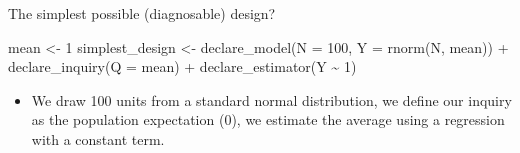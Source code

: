 \documentclass[
  11pt,
  ignorenonframetext,
]{beamer}
\newenvironment{Shaded}{\begin{snugshade}}{\end{snugshade}}
\newcommand{\AttributeTok}[1]{\textcolor[rgb]{0.40,0.45,0.13}{#1}}
\newcommand{\DecValTok}[1]{\textcolor[rgb]{0.68,0.00,0.00}{#1}}
\newcommand{\FunctionTok}[1]{\textcolor[rgb]{0.28,0.35,0.67}{#1}}
\newcommand{\NormalTok}[1]{\textcolor[rgb]{0.00,0.23,0.31}{#1}}
\newcommand{\OtherTok}[1]{\textcolor[rgb]{0.00,0.23,0.31}{#1}}
\newcommand{\SpecialCharTok}[1]{\textcolor[rgb]{0.37,0.37,0.37}{#1}}
\providecommand{\tightlist}{%
  \setlength{\itemsep}{0pt}\setlength{\parskip}{0pt}}\usepackage{longtable,booktabs,array}
\begin{document}
\begin{frame}[fragile]{The simplest possible (diagnosable) design?}
\protect\hypertarget{the-simplest-possible-diagnosable-design}{}
\begin{Shaded}
\begin{Highlighting}[]
\NormalTok{mean }\OtherTok{\textless{}{-}} \DecValTok{1}
\NormalTok{simplest\_design }\OtherTok{\textless{}{-}} 
  \FunctionTok{declare\_model}\NormalTok{(}\AttributeTok{N =} \DecValTok{100}\NormalTok{, }\AttributeTok{Y =} \FunctionTok{rnorm}\NormalTok{(N, mean)) }\SpecialCharTok{+}
  \FunctionTok{declare\_inquiry}\NormalTok{(}\AttributeTok{Q =}\NormalTok{ mean) }\SpecialCharTok{+}
  \FunctionTok{declare\_estimator}\NormalTok{(Y }\SpecialCharTok{\textasciitilde{}} \DecValTok{1}\NormalTok{)}
\end{Highlighting}
\end{Shaded}

\begin{itemize}
\tightlist
\item
  We draw 100 units from a standard normal distribution, we define our
  inquiry as the population expectation (0), we estimate the average
  using a regression with a constant term.
\end{itemize}
\end{frame}
\end{document}
